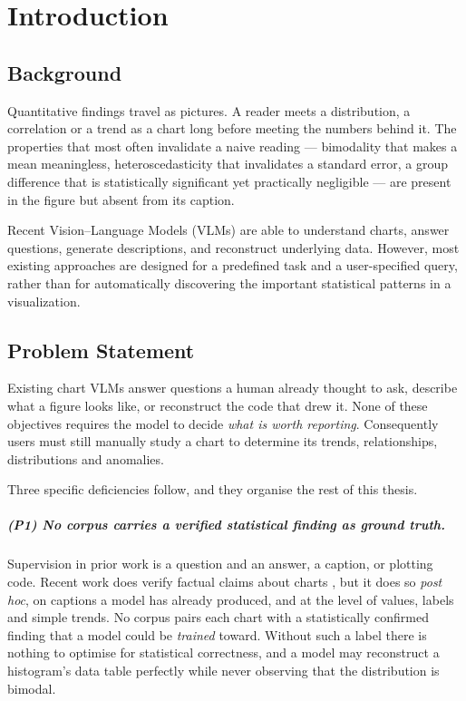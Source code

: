 \chapter{Introduction}
\label{ch:intro}

\section{Background}

Quantitative findings travel as pictures. A reader meets a distribution, a
correlation or a trend as a chart long before meeting the numbers behind it. The
properties that most often invalidate a naive reading --- bimodality that makes a
mean meaningless, heteroscedasticity that invalidates a standard error, a group
difference that is statistically significant yet practically negligible --- are
present in the figure but absent from its caption.

Recent Vision--Language Models (VLMs) are able to understand charts, answer
questions, generate descriptions, and reconstruct underlying data. However, most
existing approaches are designed for a predefined task and a user-specified
query, rather than for automatically discovering the important statistical
patterns in a visualization.

\section{Problem Statement}
\label{sec:problem}

Existing chart VLMs answer questions a human already thought to ask, describe
what a figure looks like, or reconstruct the code that drew it. None of these
objectives requires the model to decide \emph{what is worth reporting}.
Consequently users must still manually study a chart to determine its trends,
relationships, distributions and anomalies.

Three specific deficiencies follow, and they organise the rest of this thesis.

\paragraph{(P1) No corpus carries a verified \emph{statistical} finding as
ground truth.} Supervision in prior work is a question and an answer, a caption,
or plotting code. Recent work does verify factual claims about charts
\citep{chocolate,techrxiv}, but it does so \emph{post hoc}, on captions a model
has already produced, and at the level of values, labels and simple trends.
No corpus pairs each chart with a statistically confirmed finding that a model
could be \emph{trained} toward. Without such a label there is nothing to optimise
for statistical correctness, and a model may reconstruct a histogram's data table
perfectly while never observing that the distribution is bimodal.

